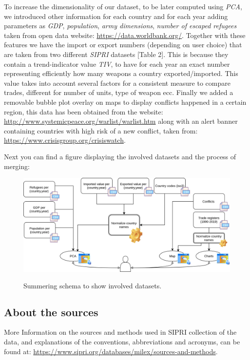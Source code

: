 \documentclass{article}
\begin{document}
\begin{multicols}{2}
To increase the dimensionality of our dataset, to be later computed using \textit{PCA}, we introduced other information for each country and for each year adding parameters as \textit{GDP}, \textit{population}, \textit{army dimensions}, \textit{number of escaped refugees} taken from open data website: \url{https://data.worldbank.org/}. 
Together with these features we have the import or export numbers (depending on user choice) that are taken from two different \textit{SIPRI} datasets [Table 2]. This is because they contain a trend-indicator value \textit{TIV}, to have for each year an exact number representing efficiently how many weapons a country exported/imported. This value takes into account several factors for a consistent measure to compare trades, different for number of units, type of weapon ecc.
Finally we added a removable bubble plot overlay on maps to display conflicts happened in a certain region, this data has been obtained from the website: \url{http://www.systemicpeace.org/warlist/warlist.htm} along with an alert banner containing countries with high risk of a new conflict, taken from:  \url{https://www.crisisgroup.org/crisiswatch}.  





Next you can find a figure displaying the involved datasets and the process of merging:

\begin{figure}[H]

		\centering
	\includegraphics[scale=0.07,center]{./fig/vaBigDataIcons2.jpg}
	\label{fig:vaBigData}
	\caption{Summering schema to show involved datasets.}
	
	\end{figure}

\subsection{About the sources}
More Information on the sources and methods used in SIPRI collection of the data, and explanations of the conventions, abbreviations and acronyms, can be found at: \url{https://www.sipri.org/databases/milex/sources-and-methods}.



\end{multicols}
\end{document}
